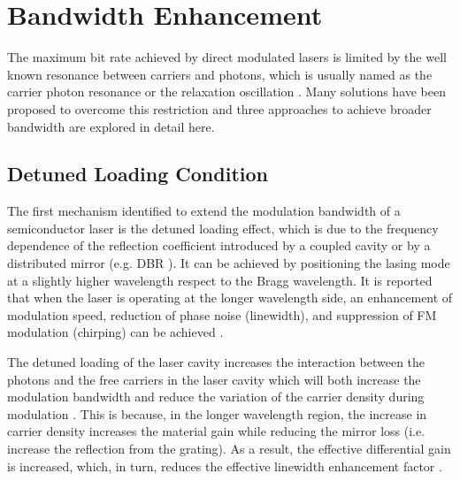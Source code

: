 \section{Bandwidth Enhancement}\label{sec:bandwidth_enhancement}
The maximum bit rate achieved by direct modulated lasers is limited by the well known resonance between carriers and photons, which is usually named as the carrier photon resonance or the relaxation oscillation \cite{coldren2012diode}. Many solutions have been proposed to overcome this restriction and three approaches to achieve broader bandwidth are explored in detail here. 
\subsection{Detuned Loading Condition}\label{subsec:detuned_loading}
The first mechanism identified to extend the modulation bandwidth of a semiconductor laser is the detuned loading effect, which is due to the frequency dependence of the reflection coefficient introduced by a coupled cavity \cite{vahala1984detuned, vahala1985observation} or by a distributed mirror (e.g. DBR \cite{feiste1998optimization, kjebon1997two, chacinski2010impact}). It can be achieved by positioning the lasing mode at a slightly higher wavelength respect to the Bragg wavelength. It is reported that when the laser is operating at the longer wavelength side, an enhancement of modulation speed, reduction of phase noise (linewidth), and suppression of FM modulation (chirping) can be achieved \cite{vahala1984detuned}. 

The detuned loading of the laser cavity increases the interaction between the photons and the free carriers in the laser cavity which will both increase the modulation bandwidth and reduce the variation of the carrier density during modulation \cite{kjebon2002experimental}. This is because, in the longer wavelength region, the increase in carrier density increases the material gain while reducing the mirror loss (i.e. increase the reflection from the grating). As a result, the effective differential gain is increased, which, in turn, reduces the effective linewidth enhancement factor \cite{vahala1984detuned, chacinski2010impact}.

